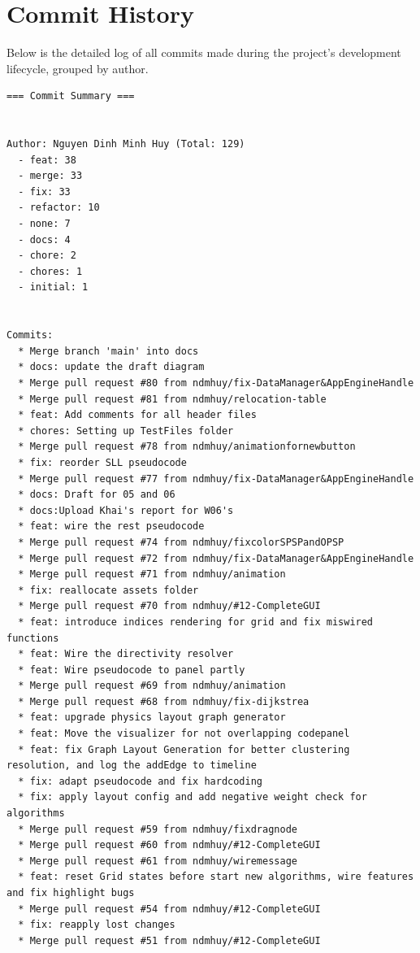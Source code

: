 \section*{Commit History}


Below is the detailed log of all commits made during the project's development lifecycle, grouped by author.


\begin{small}
\begin{verbatim}
=== Commit Summary ===


Author: Nguyen Dinh Minh Huy (Total: 129)
  - feat: 38
  - merge: 33
  - fix: 33
  - refactor: 10
  - none: 7
  - docs: 4
  - chore: 2
  - chores: 1
  - initial: 1


Commits:
  * Merge branch 'main' into docs
  * docs: update the draft diagram
  * Merge pull request #80 from ndmhuy/fix-DataManager&AppEngineHandle
  * Merge pull request #81 from ndmhuy/relocation-table
  * feat: Add comments for all header files
  * chores: Setting up TestFiles folder
  * Merge pull request #78 from ndmhuy/animationfornewbutton
  * fix: reorder SLL pseudocode
  * Merge pull request #77 from ndmhuy/fix-DataManager&AppEngineHandle
  * docs: Draft for 05 and 06
  * docs:Upload Khai's report for W06's
  * feat: wire the rest pseudocode
  * Merge pull request #74 from ndmhuy/fixcolorSPSPandOPSP
  * Merge pull request #72 from ndmhuy/fix-DataManager&AppEngineHandle
  * Merge pull request #71 from ndmhuy/animation
  * fix: reallocate assets folder
  * Merge pull request #70 from ndmhuy/#12-CompleteGUI
  * feat: introduce indices rendering for grid and fix miswired functions
  * feat: Wire the directivity resolver
  * feat: Wire pseudocode to panel partly
  * Merge pull request #69 from ndmhuy/animation
  * Merge pull request #68 from ndmhuy/fix-dijkstrea
  * feat: upgrade physics layout graph generator
  * feat: Move the visualizer for not overlapping codepanel
  * feat: fix Graph Layout Generation for better clustering resolution, and log the addEdge to timeline
  * fix: adapt pseudocode and fix hardcoding
  * fix: apply layout config and add negative weight check for algorithms
  * Merge pull request #59 from ndmhuy/fixdragnode
  * Merge pull request #60 from ndmhuy/#12-CompleteGUI
  * Merge pull request #61 from ndmhuy/wiremessage
  * feat: reset Grid states before start new algorithms, wire features and fix highlight bugs
  * Merge pull request #54 from ndmhuy/#12-CompleteGUI
  * fix: reapply lost changes
  * Merge pull request #51 from ndmhuy/#12-CompleteGUI

\end{verbatim}
\end{small}
